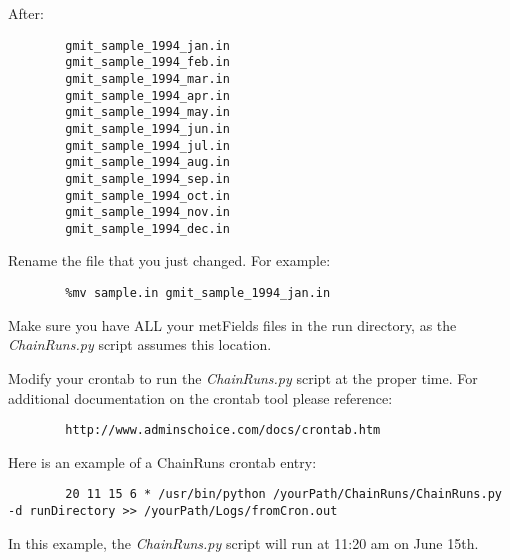 After:

\begin{verbatim}
        gmit_sample_1994_jan.in
        gmit_sample_1994_feb.in
        gmit_sample_1994_mar.in 
        gmit_sample_1994_apr.in
        gmit_sample_1994_may.in
        gmit_sample_1994_jun.in
        gmit_sample_1994_jul.in
        gmit_sample_1994_aug.in
        gmit_sample_1994_sep.in 
        gmit_sample_1994_oct.in
        gmit_sample_1994_nov.in
        gmit_sample_1994_dec.in
\end{verbatim}


Rename the file that you just changed. For example:

\begin{verbatim}
        %mv sample.in gmit_sample_1994_jan.in
\end{verbatim}

\begin{remark}
Make sure you have ALL your metFields files in the run directory, as the {\em ChainRuns.py}
script assumes this location.
\end{remark}

Modify your crontab to run the {\em ChainRuns.py} script at the proper time. 
For additional documentation on the crontab tool please reference:

\begin{verbatim}
        http://www.adminschoice.com/docs/crontab.htm
\end{verbatim}

Here is an example of a ChainRuns crontab entry:

\begin{verbatim}
        20 11 15 6 * /usr/bin/python /yourPath/ChainRuns/ChainRuns.py -d runDirectory >> /yourPath/Logs/fromCron.out
\end{verbatim}

In this example, the {\em ChainRuns.py} script will run at 11:20 am on June 15th.
